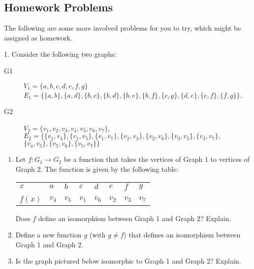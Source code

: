 \documentclass[10pt,]{book}
\theoremstyle{plain}
\theoremstyle{definition}
\theoremstyle{definition}
\theoremstyle{definition}
\numberwithin{equation}{chapter}
\newcommand{\hrulethin}  {\noalign{\hrule height 0.04em}}
\newcommand{\vtx}[2]{node[fill,circle,inner sep=0pt, minimum size=4pt,label=#1:#2]{}}
\renewcommand{\v}{\vtx{above}{}}
\begin{document}
\subsection[Homework Problems]{Homework Problems}\label{exercises-30}

      The following are some more involved problems for you to try, which might be assigned as homework.
\begin{exerciselist}
\item[1.]\hypertarget{exercise-313}{}
            Consider the following two graphs:
\leavevmode%
\begin{description}
\item[G1]\hypertarget{li-1295}{}\(V_1=\{a,b,c,d,e,f,g\}\)\(E_1=\{\{a,b\},\{a,d\},\{b,c\},\{b,d\},\{b,e\},\{b,f\},\{c,g\},\{d,e\},\{e,f\},\{f,g\}\}\).\item[G2]\hypertarget{li-1296}{}\(V_2=\{v_1,v_2,v_3,v_4,v_5,v_6,v_7\}\),
               \(E_2=\{\{v_1,v_4\},\{v_1,v_5\},\{v_1,v_7\},\{v_2,v_3\},\{v_2,v_6\},\{v_3,v_5\},\{v_3,v_7\},\)\(\{v_4,v_5\},\{v_5,v_6\},\{v_5,v_7\}\}\)\end{description}
\leavevmode%
\begin{enumerate}[label=(\alph*)]
\item\hypertarget{li-1297}{}
                Let \(f:G_1 \rightarrow G_2\) be a function that takes the vertices of Graph 1 to vertices of Graph 2. The function is given by the following table:
                \begin{tabular}{llllllll}
\(x\)&\(a\)&\(b\)&\(c\)&\(d\)&\(e\)&\(f\)&\(g\)\tabularnewline[0pt]
&\tabularnewline\hrulethin
\(f(x)\)&\(v_4\)&\(v_5\)&\(v_1\)&\(v_6\)&\(v_2\)&\(v_3\)&\(v_7\)
\end{tabular}

                Does \(f\) define an isomorphism between Graph 1 and Graph 2? Explain.


\item\hypertarget{li-1298}{}
                Define a new function \(g\) (with \(g\not=f\)) that defines an isomorphism between Graph 1 and Graph 2.


\item\hypertarget{li-1299}{}
                Is the graph pictured below isomorphic to Graph 1 and Graph 2? Explain.
                \leavevmode%
\begin{figure}
\centering
{
}
\end{figure}



\end{enumerate}
\end{exerciselist}
\end{document}
